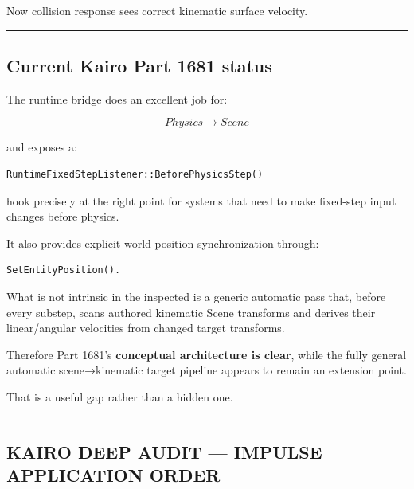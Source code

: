 Now collision response sees correct kinematic surface velocity.

\begin{center}\rule{0.5\linewidth}{0.5pt}\end{center}

\subsection{Current Kairo Part 1681 status}\label{06-engine-ii-ch037-current-kairo-part-1681-status}

\hypertarget{06-engine-ii-ch037-current-kairo-part-1681-status}{}

The runtime bridge does an excellent job for:

\[
Physics\rightarrow Scene
\]

and exposes a:

\begin{verbatim}
RuntimeFixedStepListener::BeforePhysicsStep()
\end{verbatim}

hook precisely at the right point for systems that need to make fixed-step input changes before physics.

It also provides explicit world-position synchronization through:

\begin{verbatim}
SetEntityPosition().
\end{verbatim}

What is not intrinsic in the inspected  is a generic automatic pass that, before every substep, scans authored kinematic Scene transforms and derives their linear/angular velocities from changed target transforms.

Therefore Part 1681's \textbf{conceptual architecture is clear}, while the fully general automatic scene→kinematic target pipeline appears to remain an extension point.

That is a useful gap rather than a hidden one.

\begin{center}\rule{0.5\linewidth}{0.5pt}\end{center}

\subsection{KAIRO DEEP AUDIT --- IMPULSE APPLICATION ORDER}\label{06-engine-ii-ch037-kairo-deep-audit-impulse-application-order}

